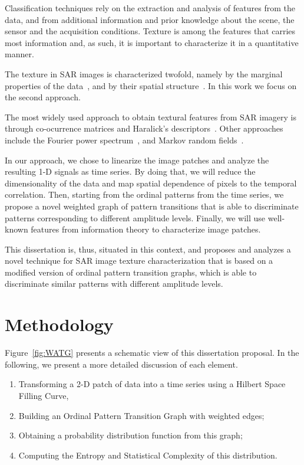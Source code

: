 \documentclass[paper=letter, fontsize=12pt]{article}
\begin{document}
Classification techniques rely on the extraction and analysis of features from the data, and from additional information and prior knowledge about  the scene, the sensor and the acquisition conditions.
Texture is among the features that carries most information and, as such, it is important to characterize it in a quantitative manner.

The texture in SAR images is characterized twofold, namely by the marginal properties of the data~\cite{adrian96}, and by their spatial structure~\cite{FeaturesCropDiscrimination}.
In this work we focus on the second approach.

The most widely used approach to obtain textural features from SAR imagery is through co-ocurrence matrices and Haralick's descriptors~\cite{Zakeri2017Texture}.
Other approaches include the Fourier power spectrum~\cite{Florindo2012Fractal}, and
Markov random fields~\cite{Deng2005UnsupervisedSO}.

In our approach, we chose to linearize the image patches and analyze the resulting 1-D signals as time series.
By doing that, we will reduce the dimensionality of the data and map spatial dependence of pixels to the temporal correlation.
Then, starting from the ordinal patterns from the time series, we propose a novel weighted graph of pattern transitions that is able to discriminate patterns corresponding to different amplitude levels.
Finally, we will use well-known features from information theory to characterize image patches.
	
This dissertation is, thus, situated in this context, and proposes and analyzes a novel technique for SAR image texture characterization that is based on a modified version of ordinal pattern transition graphs, which is able to discriminate similar patterns with different amplitude levels. 
	

\section{Methodology}\label{methodology}

Figure~\ref{fig:WATG} presents a schematic view of this dissertation proposal. 
In the following, we present a more detailed discussion of each element.

\begin{enumerate}
	\item\label{item:Linearlize} Transforming a 2-D patch of data into a time series using a Hilbert Space Filling Curve,
	\item\label{item:WOPTG} Building an Ordinal Pattern Transition Graph with weighted edges;
	\item\label{item:Probability} Obtaining a probability distribution function from this graph;
	\item\label{item:Descriptors} Computing the Entropy and Statistical Complexity of this distribution.
\end{enumerate}
\end{document}
